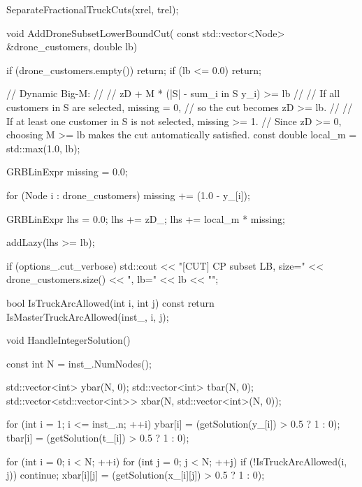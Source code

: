 {{{{                SeparateFractionalTruckCuts(xrel, trel);
            }

            void AddDroneSubsetLowerBoundCut(
                const std::vector<Node> &drone_customers,
                double lb)
            {
                if (drone_customers.empty())
                    return;
                if (lb <= 0.0)
                    return;

                // Dynamic Big-M:
                //
                // zD + M * (|S| - sum_{i in S} y_i) >= lb
                //
                // If all customers in S are selected, missing = 0,
                // so the cut becomes zD >= lb.
                //
                // If at least one customer in S is not selected, missing >= 1.
                // Since zD >= 0, choosing M >= lb makes the cut automatically satisfied.
                const double local_m = std::max(1.0, lb);

                GRBLinExpr missing = 0.0;

                for (Node i : drone_customers)
                {
                    missing += (1.0 - y_[i]);
                }

                GRBLinExpr lhs = 0.0;
                lhs += zD_;
                lhs += local_m * missing;

                addLazy(lhs >= lb);

                if (options_.cut_verbose)
                {
                    std::cout << "[CUT] CP subset LB, size="
                              << drone_customers.size()
                              << ", lb=" << lb << "\n";
                }
            }
            bool IsTruckArcAllowed(int i, int j) const
            {
                return IsMasterTruckArcAllowed(inst_, i, j);
            }

            void HandleIntegerSolution()
            {
                const int N = inst_.NumNodes();

                std::vector<int> ybar(N, 0);
                std::vector<int> tbar(N, 0);
                std::vector<std::vector<int>> xbar(N, std::vector<int>(N, 0));

                for (int i = 1; i <= inst_.n; ++i)
                {
                    ybar[i] = (getSolution(y_[i]) > 0.5 ? 1 : 0);
                    tbar[i] = (getSolution(t_[i]) > 0.5 ? 1 : 0);
                }

                for (int i = 0; i < N; ++i)
                {
                    for (int j = 0; j < N; ++j)
                    {
                        if (!IsTruckArcAllowed(i, j))
                            continue;
                        xbar[i][j] = (getSolution(x_[i][j]) > 0.5 ? 1 : 0);
                    }
                }

}}}}
